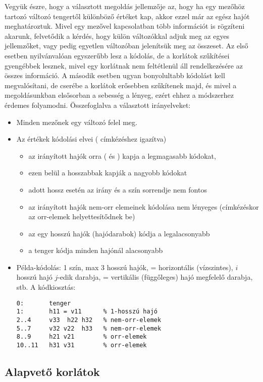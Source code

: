 Vegyük észre, hogy a választott megoldás jellemzője az, hogy ha egy mezőhöz tartozó
változó tengertől különböző értéket kap, akkor ezzel már az egész hajót meghatároztuk.
\br
Mivel egy mezővel kapcsolatban több információt is rögzíteni akarunk, felvetődik a kérdés,
hogy külön változókkal adjuk meg az egyes jellemzőket, vagy pedig egyetlen változóban
jelenítsük meg az összeset. Az első esetben nyilvánvalóan egyszerűbb lesz a kódolás,
de a korlátok szűkítései gyengébbek lesznek, mivel egy korlátnak nem feltétlenül
áll rendelkezésére az összes információ. A második esetben ugyan bonyolultabb kódolást
kell megvalósítani, de cserébe a korlátok erősebben szűkítenek majd, és mivel a
megoldásunkban elsősorban a sebesség a lényeg, ezért ehhez a módszerhez érdemes folyamodni.
\br
Összefoglalva a választott irányelveket:

\begin{itemize}
\item Minden mezőnek egy változó felel meg.
\item Az értékek kódolási elvei ( címkézéshez igazítva)
\begin{itemize}
\item az irányított hajók orra ( és ) kapja a legmagasabb
kódokat,
\item ezen belül a hosszabbak kapják a nagyobb kódokat
\item adott hossz esetén az irány és a szín sorrendje nem fontos
\item az irányított hajók nem-orr elemeinek kódolása nem lényeges (címkézéskor
az orr-elemek helyettesítődnek be)
\item az egy hosszú hajók (hajódarabok) kódja a legalacsonyabb
\item a tenger kódja minden hajónál alacsonyabb
\end{itemize}
\item Példa-kódolás: 1 szín, max 3 hosszú hajók,  = horizontális (vízszintes),
$i$ hosszú hajó $j$-edik darabja,  = vertikális (függőleges) hajó megfelelő
darabja, stb. A kódkiosztás:

\begin{verbatim}
0:       tenger
1:       h11 = v11      % 1-hosszú hajó
2..4     v33  h22 h32   % nem-orr-elemek
5..7     v32 v22  h33   % nem-orr-elemek
8..9     h21 v21        % orr-elemek
10..11   h31 v31        % orr-elemek
\end{verbatim}
\end{itemize}

\subsection{Alapvető korlátok}

